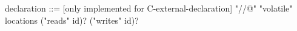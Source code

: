 \begin{syntax}
  declaration ::= {[only implemented for C-external-declaration] "//@" "volatile" locations ("reads" id)? ("writes" id)?}
\end{syntax}

